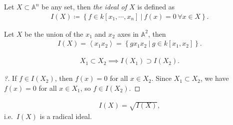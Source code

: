 \begin{definition}

Let \(X\subset {\mathbb{A}}^n\) be any set, then \emph{the ideal of
\(X\)} is defined as
\begin{align*}  
I(X) \coloneqq\left\{{f\in k[x_1, \cdots, x_n] {~\mathrel{\Big|}~}f(x) = 0\, \forall x\in X}\right\}
.\end{align*}

\end{definition}

\begin{example}

Let \(X\) be the union of the \(x_1\) and \(x_2\) axes in
\({\mathbb{A}}^2\), then
\begin{align*}
I(X) = \left\langle{x_1 x_2}\right\rangle = \left\{{g x_1 x_2 {~\mathrel{\Big|}~}g\in k[x_1, x_2]}\right\}
.\end{align*}

\end{example}

\begin{proposition}

\begin{align*}  
X_1 \subset X_2 \implies I(X_1) \supset I(X_2)
.\end{align*}

\end{proposition}

\begin{proof}[?]

If \(f\in I(X_2)\), then \(f(x) = 0\) for all \(x\in X_2\). Since
\(X_1 \subset X_2\), we have \(f(x) = 0\) for all \(x\in X_1\), so
\(f\in I(X_2)\).

\end{proof}

\begin{proposition}

\begin{align*}  
I(X) = \sqrt{I(X)}
,\end{align*}
i.e.~\(I(X)\) is a radical ideal.

\end{proposition}

